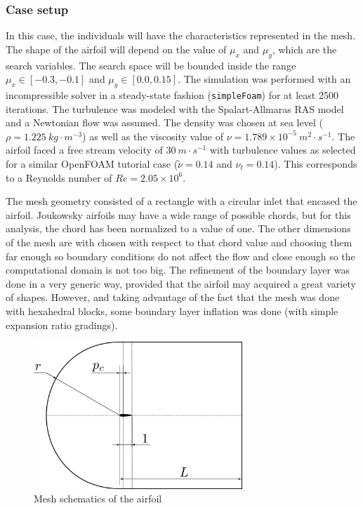 \newpage

\subsubsection*{Case setup}

In this case, the individuals will have the characteristics represented in the mesh. The shape of the airfoil will depend on the value of $\mu_x$ and $\mu_y$, which are the search variables. The search space will be bounded inside the range $\mu_x\in[-0.3,-0.1]$ and $\mu_y\in[0.0,0.15]$. The simulation was performed with an incompressible solver in a steady-state fashion (\texttt{simpleFoam}) for at least 2500 iterations. The turbulence was modeled with the Spalart-Allmaras RAS model and a Newtonian flow was assumed. The density was chosen at sea level ($\rho=1.225\ kg\cdot m^{-3}$) as well as the viscosity value of $\nu=1.789\times10^{-5}\ m^2\cdot s^{-1}$. The airfoil faced a free stream velocity of $30\ m\cdot s^{-1}$ with turbulence values as selected for a similar OpenFOAM tutorial case ($\tilde{\nu}=0.14$ and $\nu_t =0.14$). This corresponds to a Reynolds number of $Re=2.05\times10^6$.

The mesh geometry consisted of a rectangle with a circular inlet that encased the airfoil. Joukowsky airfoils may have a wide range of possible chords, but for this analysis, the chord has been normalized to a value of one. The other dimensions of the mesh are with chosen with respect to that chord value and choosing them far enough so boundary conditions do not affect the flow and close enough so the computational domain is not too big. The refinement of the boundary layer was done in a very generic way, provided that the airfoil may acquired a great variety of shapes. However, and taking advantage of the fact that the mesh was done with hexahedral blocks, some boundary layer inflation was done (with simple expansion ratio gradings). 


     \begin{figure}[h!]
        \centering
        \includegraphics[width=0.7\textwidth]{Figures/3/airfoil2d.png}
        \caption{Mesh schematics of the airfoil}
        \label{fig:airofilMesh}
    \end{figure}

